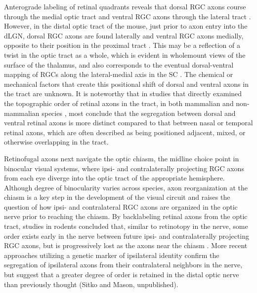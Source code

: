 Anterograde labeling of retinal quadrants reveals that dorsal RGC axons course through the medial optic tract and ventral RGC axons through the lateral tract \cite{chan1999changes,chan1994changes,plas2005pretarget,reese1993reestablishment,reese1990fibre,reh1983organization}.
However, in the distal optic tract of the mouse, just prior to axon entry into the dLGN, dorsal RGC axons are found laterally and ventral RGC axons medially, opposite to their position in the proximal tract \cite{plas2005pretarget}. %
This may be a reflection of a twist in the optic tract as a whole, which is evident in wholemount views of the surface of the thalamus, and also corresponds to the eventual dorsal-ventral mapping of RGCs along the lateral-medial axis in the SC \cite{plas2005pretarget}.
The chemical or mechanical factors that create this positional shift of dorsal and ventral axons in the tract are unknown.
It is noteworthy that in studies that directly examined the topographic order of retinal axons in the tract, in both mammalian \cite{chan1994changes,plas2005pretarget,reese1993reestablishment} and non-mammalian species \cite{ehrlich1984course,montgomery1998organization,reh1983organization,thanos1983investigations}, most conclude that the segregation between dorsal and ventral retinal axons is more distinct compared to that between nasal or temporal retinal axons, which are often described as being positioned adjacent, mixed, or otherwise overlapping in the tract.

Retinofugal axons next navigate the optic chiasm, the midline choice point in binocular visual systems, where ipsi- and contralaterally projecting RGC axons from each eye diverge into the optic tract of the appropriate hemisphere.
Although degree of binocularity varies across species, axon reorganization at the chiasm is a key step in the development of the visual circuit and raises the question of how ipsi- and contralateral RGC axons are organized in the optic nerve prior to reaching the chiasm.
By backlabeling retinal axons from the optic tract, studies in rodents concluded that, similar to retinotopy in the nerve, some order exists early in the nerve between future ipsi- and contralaterally projecting RGC axons, but is progressively lost as the axons near the chiasm \cite{baker1989distribution,colello1990early}.
More recent approaches utilizing a genetic marker of ipsilateral identity confirm the segregation of ipsilateral axons from their contralateral neighbors in the nerve, but suggest that a greater degree of order is retained in the distal optic nerve than previously thought (Sitko and Mason, unpublished).

